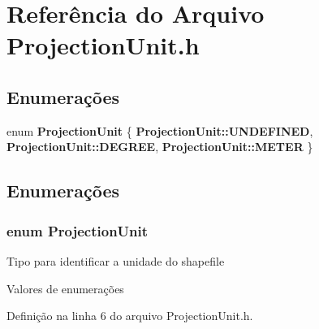 \section{Referência do Arquivo Projection\+Unit.\+h}
\label{_projection_unit_8h}
\subsection*{Enumerações}
\begin{DoxyCompactItemize}
\item 
enum {\bf Projection\+Unit} \{ {\bf Projection\+Unit\+::\+U\+N\+D\+E\+F\+I\+N\+ED}, 
{\bf Projection\+Unit\+::\+D\+E\+G\+R\+EE}, 
{\bf Projection\+Unit\+::\+M\+E\+T\+ER}
 \}
\end{DoxyCompactItemize}


\subsection{Enumerações}
\subsubsection[{Projection\+Unit}]{\setlength{\rightskip}{0pt plus 5cm}enum {\bf Projection\+Unit}\hspace{0.3cm}{\ttfamily [strong]}}\label{_projection_unit_8h_a2120aa6d1e39ff7794fcc12f1e55e49c}
Tipo para identificar a unidade do shapefile \begin{Desc}
\item[Valores de enumerações]\par
\begin{description}
\item[{\em 
U\+N\+D\+E\+F\+I\+N\+ED\label{_projection_unit_8h_a2120aa6d1e39ff7794fcc12f1e55e49ca0db45d2a4141101bdfe48e3314cfbca3}
}]\item[{\em 
D\+E\+G\+R\+EE\label{_projection_unit_8h_a2120aa6d1e39ff7794fcc12f1e55e49ca536890ac9b7738283f05d5c2cf979fe1}
}]\item[{\em 
M\+E\+T\+ER\label{_projection_unit_8h_a2120aa6d1e39ff7794fcc12f1e55e49cacc7ab7853e03a21956737fb272615996}
}]\end{description}
\end{Desc}


Definição na linha 6 do arquivo Projection\+Unit.\+h.

